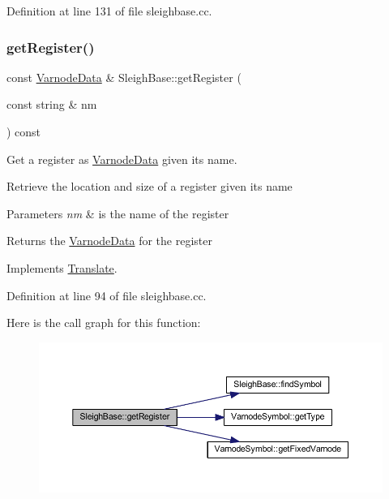 Definition at line 131 of file sleighbase.\+cc.

\mbox{\label{class_sleigh_base_ad347067ddd9469322e79b97a19386f82}} 
\subsubsection{\texorpdfstring{getRegister()}{getRegister()}}
{\footnotesize\ttfamily const \mbox{\hyperlink{struct_varnode_data}{Varnode\+Data}} \& Sleigh\+Base\+::get\+Register (\begin{DoxyParamCaption}\item[{const string \&}]{nm }\end{DoxyParamCaption}) const\hspace{0.3cm}{\ttfamily [virtual]}}



Get a register as \mbox{\hyperlink{struct_varnode_data}{Varnode\+Data}} given its name. 

Retrieve the location and size of a register given its name 
\begin{DoxyParams}{Parameters}
{\em nm} & is the name of the register \\
\hline
\end{DoxyParams}
\begin{DoxyReturn}{Returns}
the \mbox{\hyperlink{struct_varnode_data}{Varnode\+Data}} for the register 
\end{DoxyReturn}


Implements \mbox{\hyperlink{class_translate_a3a62c460db4eccc285fa3dd29dd4a29b}{Translate}}.



Definition at line 94 of file sleighbase.\+cc.

Here is the call graph for this function\+:
\nopagebreak
\begin{figure}[H]
\begin{center}
\leavevmode
\includegraphics[width=350pt]{class_sleigh_base_ad347067ddd9469322e79b97a19386f82_cgraph}
\end{center}
\end{figure}
\mbox{\label{class_sleigh_base_a76bd4052e92fd37b38c49768e4020652}} 
